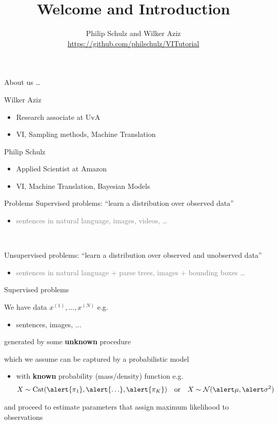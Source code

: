 \documentclass[14pt]{beamer}
\title{Welcome and Introduction}
\date{}
\author[Schulz and Aziz]{Philip Schulz and Wilker Aziz \\
\url{https://github.com/philschulz/VITutorial}}
\begin{document}
\frame{\titlepage}

\begin{frame}{About us \ldots}
\begin{block}{Wilker Aziz}
\begin{itemize}
\item Research associate at UvA
\item VI, Sampling methods, Machine Translation
\end{itemize}
\end{block}

\begin{block}{Philip Schulz}
\begin{itemize}
\item Applied Scientist at Amazon
\item VI, Machine Translation, Bayesian Models
\end{itemize}
\end{block}
\end{frame}

\begin{frame}{Problems}
Supervised problems: \alert{``learn a distribution over observed data''}
\begin{itemize}
	\item \textcolor{gray}{sentences in natural language, images, videos, \ldots}
\end{itemize}

~

Unsupervised problems: \alert{``learn a distribution over observed and unobserved data''}
\begin{itemize}
	\item \textcolor{gray}{sentences in natural language + parse trees, images + bounding boxes \ldots}
\end{itemize}
\end{frame}



\begin{frame}{Supervised problems}

\small

We have data $x^{(1)}, \ldots, x^{(N)}$ e.g.  \\
\begin{itemize}
	\item sentences, images, ...
\end{itemize}
generated by some {\bf unknown} procedure

\pause

which we assume can be captured by a probabilistic model



\begin{itemize}
	\item with {\bf known} probability (mass/density) function e.g.
	\begin{align*}
    X \sim \Cat(\alert{\pi_1}, \alert{\ldots}, \alert{\pi_K}) & & \text{or} & & X \sim \mathcal N(\alert\mu, \alert\sigma^2)
    \end{align*}    
\end{itemize}
\pause
and proceed to \alert{estimate parameters} that assign maximum likelihood to observations

\end{frame}
\end{document}
